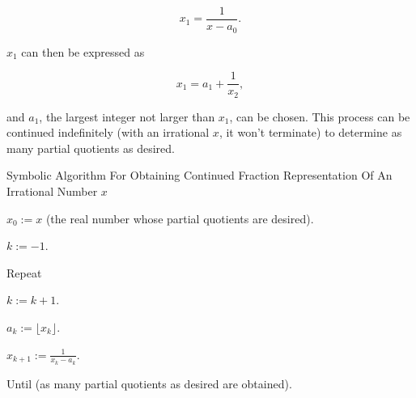 \begin{equation}
x_1 = \frac{1}{x - a_0} .
\end{equation}

\noindent{}$x_1$ can then be expressed as

\begin{equation}
x_1 = a_1 + \frac{1}{x_2} ,
\end{equation}

\noindent{}and $a_1$, the largest integer not larger than $x_1$,
can be chosen.
This process can be continued indefinitely (with an irrational $x$, it won't terminate)
to determine as many partial quotients as desired.

\begin{vworkalgorithmstatementpar}
   {Symbolic Algorithm For Obtaining
    Continued Fraction Representation Of An Irrational Number
   \mbox{\boldmath $x$}}
\label{alg:ccfr0:scin0:symboliccfalgorithm}
\begin{alglvl0}
\item $x_0 := x$ (the real number whose partial quotients are desired).
\item $k := -1$.
\item Repeat
   \begin{alglvl1}
   \item $k := k + 1$.
   \item $a_k := \lfloor x_k \rfloor$.
   \item $x_{k+1} := \displaystyle{\frac{1}{x_k - a_k}}$.
   \end{alglvl1}
\item Until (as many partial quotients as desired are obtained).
\end{alglvl0}
\end{vworkalgorithmstatementpar}

